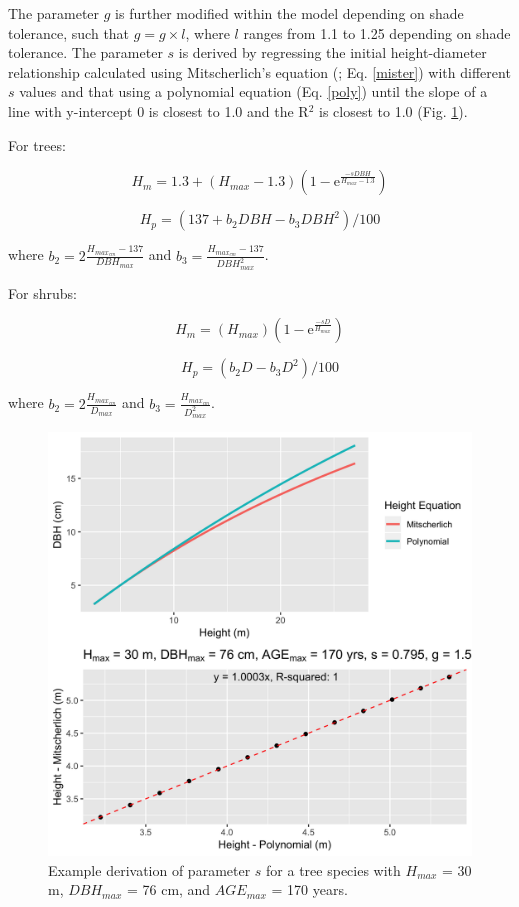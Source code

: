\documentclass[a4paper, 12pt] {article}
\begin{document}
The parameter $g$ is further modified within the model depending on shade tolerance, such that $g = g \times l$, where $l$ ranges from 1.1 to 1.25 depending on shade tolerance. The parameter $s$ is derived by regressing the initial height-diameter relationship calculated using Mitscherlich's equation (; Eq. \ref{mister}) with different $s$ values and that using a polynomial equation (Eq. \ref{poly}) until the slope of a line with y-intercept 0 is closest to 1.0 and the R$^2$ is closest to 1.0 (Fig. \ref{fig:sderiv}). 

For trees: 

\begin{equation} \label{mister}
H_m = 1.3 + (H_{max} - 1.3)(1 - \text{e}^{\frac{-sDBH}{H_{max} - 1.3}})
\end{equation}

\begin{equation} \label{poly}
H_p = (137 + b_2DBH - b_3DBH^2)/100
\end{equation}

where $b_2 = 2\frac{H_{max_{cm}} - 137}{DBH_{max}}$ and   $b_3 = \frac{H_{max_{cm}} - 137}{DBH^2_{max}}$.

For shrubs: 

\begin{equation} 
	H_m = (H_{max})(1 - \text{e}^{\frac{-sD}{H_{max}}})
\end{equation}

\begin{equation}
	H_p = (b_2D - b_3D^2)/100
\end{equation}

where $b_2 = 2\frac{H_{max_{cm}} }{D_{max}}$ and   $b_3 = \frac{H_{max_{cm}} }{D^2_{max}}$.

\begin{figure}[H]
  \includegraphics[width=0.8\linewidth]{manual_figures/Sderiv.png}
  \caption{Example derivation of parameter $s$ for a tree species with $H_{max}$ = 30 m, $DBH_{max}$ = 76 cm, and $AGE_{max}$ = 170 years.}
  \label{fig:sderiv}
\end{figure}
\end{document}
